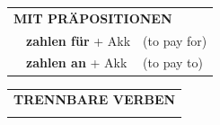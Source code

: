 \documentclass[10pt,a4paper]{revtex4-2}
\begin{document}
\begin{verbbox}
\vspace{10pt}

\begin{tabular}{lll}
\multicolumn{3}{l}{\textbf{MIT PRÄPOSITIONEN}}\\
& \textbf{zahlen für} + Akk & (to pay for)\\
& \textbf{zahlen an} + Akk & (to pay to)\\
\end{tabular}
\hfill
\begin{tabular}{lll}
\multicolumn{3}{l}{\textbf{TRENNBARE VERBEN}}\\
\vspace{20pt}
\end{tabular}
\vspace{-5pt}
\end{verbbox}
\end{document}
